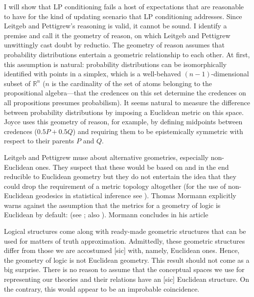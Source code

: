 \documentclass[12pt]{article}
\begin{document}
I will show that LP conditioning fails a host of expectations that are
reasonable to have for the kind of updating scenario that LP
conditioning addresses. Since Leitgeb and Pettigrew's reasoning is
valid, it cannot be sound. I identify a premise and call it the
geometry of reason, on which Leitgeb and Pettigrew unwittingly cast
doubt by reductio. The geometry of reason assumes that probability
distributions entertain a geometric relationship to each other. At
first, this assumption is natural: probability distributions can be
isomorphically identified with points in a simplex, which is a
well-behaved $(n-1)$-dimensional subset of $\mathbb{R}^{n}$ ($n$ is
the cardinality of the set of atoms belonging to the propositional
algebra---that the credences on this set determine the credences on
all propositions presumes probabilism). It seems natural to measure
the difference between probability distributions by imposing a
Euclidean metric on this space. Joyce uses this geometry of reason,
for example, by defining midpoints between credences ($0.5P+0.5Q$) and
requiring them to be epistemically symmetric with respect to their
parents $P$ and $Q$.

Leitgeb and Pettigrew muse about alternative geometries, especially
non-Euclidean ones. They suspect that these would be based on and in
the end reducible to Euclidean geometry but they do not entertain the
idea that they could drop the requirement of a metric topology
altogether (for the use of non-Euclidean geodesics in statistical
inference see ). Thomas Mormann explicitly warns
against the assumption that the metrics for a geometry of logic is
Euclidean by default:  (see ; also
). Mormann concludes in his article

\begin{quotex}
  Logical structures come along with ready-made geometric structures
  that can be used for matters of truth approximation. Admittedly,
  these geometric structures differ from those we are accostumed [sic]
  with, namely, Euclidean ones. Hence, the geometry of logic is not
  Euclidean geometry. This result should not come as a big surprise.
  There is no reason to assume that the conceptual spaces we use for
  representing our theories and their relations have an [sic]
  Euclidean structure. On the contrary, this would appear to be an
  improbable coincidence. 
\end{quotex}
\end{document}
